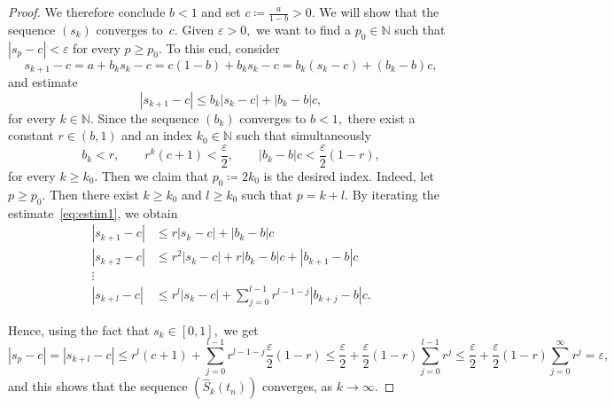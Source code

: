 \documentclass{amsart}
\theoremstyle{plain}
\theoremstyle{definition}
\def\l{\left}
\def\r{\right}
\def\as{\coloneqq}
\def\nat{\mathbb{N}}
\def\eps{\varepsilon}
\newcommand{\hlf}[1]{\frac{#1}{2}}
\renewcommand{\hat}{\widehat}
\begin{document}
\begin{proof}
We therefore conclude $b<1$ and set $c\as\frac{a}{1-b}>0.$ We will show that the sequence $\l(s_k\r)$ converges to~$c.$ Given $\eps>0,$ we want to find a $p_0\in\nat$ such that $\l|s_p-c \r|<\eps$ for every $p\ge p_0.$ To this end, consider
\begin{equation*}
 s_{k+1}-c = a + b_k s_k - c = c(1-b) + b_k s_k - c = b_k\l(s_k-c\r) + \l(b_k-b\r)c, 
 \end{equation*}
 and estimate
 \begin{equation} \label{eq:estim1}
 \l|s_{k+1}-c \r| \le b_k \l|s_k-c\r| + \l|b_k-b\r|c, 
\end{equation}
for every $k \in\nat.$ Since the sequence $\l(b_k\r)$ converges to $b<1,$ there exist a constant $r\in (b,1)$ and an index $k_0\in\nat$ such that simultaneously 
\begin{equation*}
b_k<r,\qquad r^k(c+1)<\hlf{\eps},\qquad \l|b_k-b\r|c<\hlf{\eps}(1-r),
\end{equation*}
for every $k\ge k_0.$ Then we claim that $p_0\as 2k_0$ is the desired index. Indeed, let $p\ge p_0.$ Then there exist $k\ge k_0$ and $l\ge k_0$ such that $p=k+l.$ By iterating the estimate~\eqref{eq:estim1}, we obtain
\begin{align*}
 \l|s_{k+1}-c \r| & \le r \l|s_k-c\r| + \l|b_k-b\r|c \\ \l|s_{k+2}-c \r| & \le r^2 \l|s_k-c\r| + r \l|b_k-b\r|c + \l|b_{k+1}-b\r|c \\ \vdots \\
 \l|s_{k+l}-c \r| & \le r^l \l|s_k-c\r| + \sum_{j=0}^{l-1} r^{l-1-j}\l|b_{k+j}-b\r|c.
\end{align*}

Hence, using the fact that $s_k \in [0,1],$ we get
\begin{equation*}
 \l|s_p -c \r| = \l|s_{k+l}-c \r| \le r^l (c+1) +\sum_{j=0}^{l-1} r^{l-1-j}\hlf{\eps}(1-r) \le\hlf{\eps} + \hlf{\eps}(1-r) \sum_{j=0}^{l-1} r^j \le\hlf{\eps} + \hlf{\eps}(1-r) \sum_{j=0}^\infty r^j =\eps,
\end{equation*}
and this shows that the sequence $\l(\hat{S}_k\l(t_n\r)\r)$ converges, as $k\to\infty.$


\end{proof}
\end{document}
